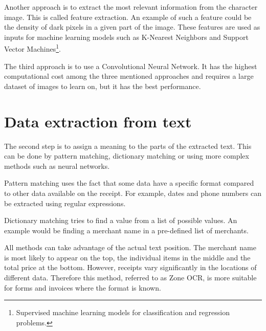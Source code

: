 \documentclass[
  digital, %
  table,   %
  oneside, %
  lof,     %
  lot,     %
]{fithesis3}
\begin{document}
Another approach is to extract the most relevant information from the character image. This is called feature extraction. An example of such a feature could be the density of dark pixels in a given part of the image. These features are used as inputs for machine learning models such as K-Nearest Neighbors and Support Vector Machines\footnote{Supervised machine learning models for classification and regression problems.}.~\cite{Singh2011Feature}

The third approach is to use a Convolutional
Neural Network. It has the highest computational cost among the three mentioned approaches and requires a large dataset of images to learn on, but it has the best performance.~\cite{Shreya2019OCRCNN}

\section{Data extraction from text}
The second step is to assign a meaning to the parts of the extracted text. This can be done by pattern matching, dictionary matching or using more complex methods such as neural networks. 

Pattern matching uses the fact that some data have a specific format compared to other data available on the receipt. For example, dates and phone numbers can be extracted using regular expressions.

Dictionary matching tries to find a value from a list of possible values. An example would be finding a merchant name in a pre-defined list of merchants.

All methods can take advantage of the actual text position. The merchant name is most likely to appear on the top, the individual items in the middle and the total price at the bottom. However, receipts vary significantly in the locations of different data. Therefore this method, referred to as Zone OCR, is more suitable for forms and invoices where the format is known.
\end{document}
